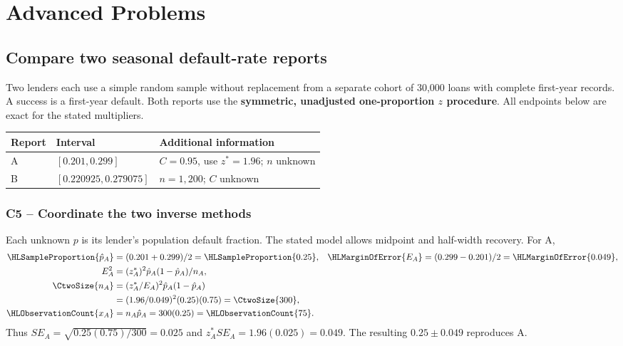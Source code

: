 \section{Advanced Problems}\label{sec:advanced}
\subsection{Compare two seasonal default-rate reports}\label{prob:c5-advanced}
Two lenders each use a simple random sample without replacement from a separate cohort of 30,000 loans with complete first-year records. A success is a first-year default. Both reports use the \textbf{symmetric, unadjusted one-proportion $z$ procedure}. All endpoints below are exact for the stated multipliers.
\begin{center}
\begin{tabular}{@{}lll@{}}\toprule
Report & Interval & Additional information\\\midrule
A & $[0.201,0.299]$ & $C=0.95$, use $z^*=1.96$; $n$ unknown\\
B & $[0.220925,0.279075]$ & $n=1,200$; $C$ unknown\\\bottomrule
\end{tabular}
\end{center}
\subsubsection*{C5 -- Coordinate the two inverse methods}\label{sol:c5-advanced-a}
Each unknown $p$ is its lender's population default fraction. The stated model allows midpoint and half-width recovery. For A,
\begin{align*}
\HLSampleProportion{\hat p_A}&=(0.201+0.299)/2=\HLSampleProportion{0.25},&
\HLMarginOfError{E_A}&=(0.299-0.201)/2=\HLMarginOfError{0.049},\\
E_A^2&=(z_A^*)^2\hat p_A(1-\hat p_A)/n_A,&&\\
\CtwoSize{n_A}&=(z_A^*/E_A)^2\hat p_A(1-\hat p_A)\\
&=(1.96/0.049)^2(0.25)(0.75)=\CtwoSize{300},\\
\HLObservationCount{x_A}&=n_A\hat p_A=300(0.25)=\HLObservationCount{75}.&&
\end{align*}
Thus $SE_A=\sqrt{0.25(0.75)/300}=0.025$ and $z_A^*SE_A=1.96(0.025)=0.049$. The resulting $0.25\pm0.049$ reproduces A.

